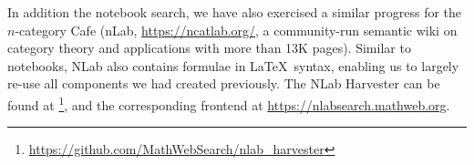 In addition the notebook search, we have also exercised a similar progress for the $n$-category Cafe (nLab, \url{https://ncatlab.org/}, a community-run semantic wiki on category theory and applications with more than 13K pages). 
Similar to notebooks, NLab also contains formulae in \LaTeX\ syntax, enabling us to largely re-use all components we had created previously.  The NLab Harvester can be found at \footnote{\url{https://github.com/MathWebSearch/nlab_harvester}}, and the corresponding frontend at \url{https://nlabsearch.mathweb.org}.


